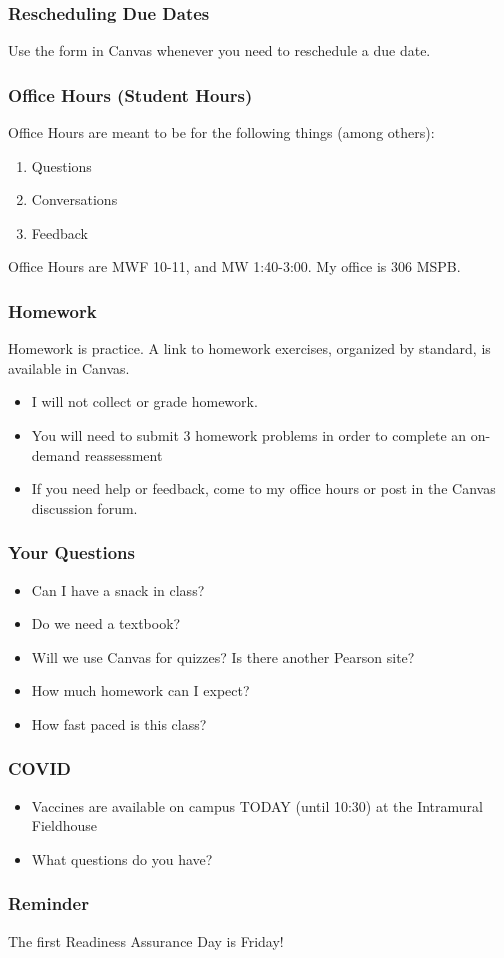 \documentclass[aspectration=1610]{beamer}
\begin{document}
\begin{frame}\frametitle{Rescheduling Due Dates}

Use the form in Canvas whenever you need to reschedule a due date.

\end{frame}


\begin{frame}\frametitle{Office Hours (Student Hours)}
Office Hours are meant to be for the following things (among others):
\begin{enumerate}
\item Questions
\item Conversations
\item Feedback
\end{enumerate}

\vspace{0.2in}

Office Hours are MWF 10-11, and MW 1:40-3:00.  My office is 306 MSPB.
\end{frame}



\begin{frame}\frametitle{Homework}
Homework is practice.  A link to homework exercises, organized by standard, is available in Canvas.
\begin{itemize}
\item I will not collect or grade homework.
\item You will need to submit 3 homework problems in order to complete an on-demand reassessment
\item If you need help or feedback, come to my office hours or post in the Canvas discussion forum.
\end{itemize}
\end{frame}

\begin{frame}\frametitle{Your Questions}

\begin{itemize}
\item Can I have a snack in class?
\item Do we need a textbook?
\item Will we use Canvas for quizzes? Is there another Pearson site?
\item How much homework can I expect?
\item How fast paced is this class?
\end{itemize}
\end{frame}

\begin{frame}\frametitle{COVID}

\begin{itemize}
\item Vaccines are available on campus TODAY (until 10:30) at the Intramural Fieldhouse
\item What questions do you have?
\end{itemize}

\end{frame}


\begin{frame}\frametitle{Reminder}
The first Readiness Assurance Day is Friday!
\end{frame}
\end{document}

